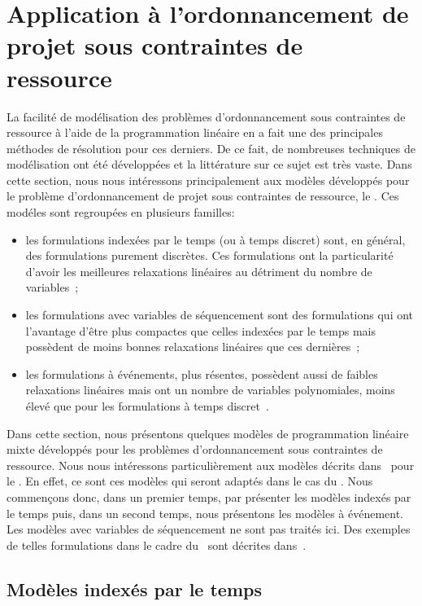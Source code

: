 \section{Application à l'ordonnancement de projet sous contraintes de
  ressource}   
\label{sec:PLNE_ordo_res}

La facilité de modélisation des problèmes d'ordonnancement sous
contraintes de ressource à l'aide de la programmation linéaire en a
fait une des principales méthodes de résolution pour ces
derniers. De ce fait, de nombreuses techniques de modélisation ont été
développées et la littérature sur ce sujet est très vaste. Dans cette
section, nous nous intéressons principalement aux modèles développés
pour le problème d'ordonnancement de projet sous contraintes de
ressource, le \RCPSP. Ces modéles sont regroupées en plusieurs
familles: 
\begin{itemize}
\item les formulations indexées par le temps (ou à temps discret)
sont, en général, des formulations purement discrètes. Ces
formulations ont la particularité d'avoir les meilleures relaxations
linéaires au détriment du nombre de
variables~\cite{CAVT,ex_RCPSP_discret};
\item les formulations avec variables de séquencement sont des
formulations qui ont l'avantage d'être plus compactes que celles
indexées par le temps mais possèdent de moins bonnes relaxations
linéaires que ces dernières~\cite{AVT,AMR};
\item les formulations à événements, plus résentes, possèdent aussi de
faibles relaxations linéaires mais ont un nombre de variables
polynomiales, moins élevé que pour les formulations à temps
discret~\cite{modele_RCPSP}.
\end{itemize}

Dans cette section, nous présentons quelques modèles de
programmation linéaire mixte développés pour les problèmes
d'ordonnancement sous contraintes de ressource. Nous nous intéressons
particulièrement aux modèles décrits dans~\cite{modele_RCPSP} 
pour le \RCPSP. En effet, ce sont ces modèles qui seront adaptés dans
le cas du \CECSP. Nous commençons donc, dans un premier temps, par
présenter les modèles indexés par le temps puis, dans un second temps, nous
présentons les modèles à événement. Les modèles avec variables de
séquencement ne sont pas traités ici. Des exemples de telles
formulations dans le cadre du \RCPSP~sont décrites dans~\cite{ADN}.

\subsection{Modèles indexés par le temps}
\label{sec:time_RCPSP}


